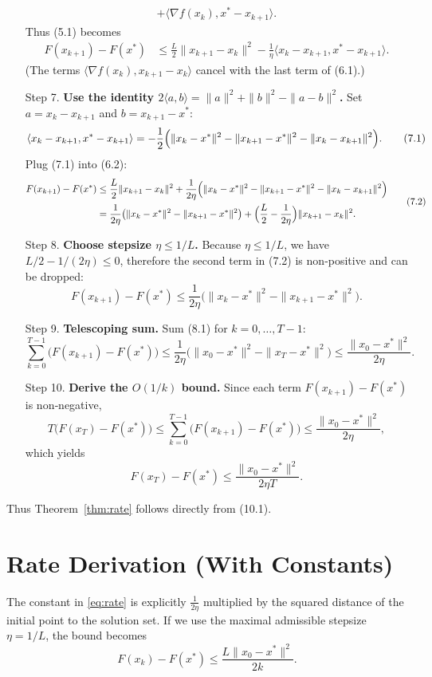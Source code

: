 \documentclass{article}
\begin{document}
\begin{enumerate}
\[\begin{aligned}
+\langle\nabla f(x_{k}),x^{*}-x_{k+1}\rangle .
\end{aligned}
\tag{6.1}
\]
Thus (5.1) becomes
\[
\begin{aligned}
F(x_{k+1})-F(x^{*})
&\le \frac{L}{2}\|x_{k+1}-x_{k}\|^{2}
   -\frac{1}{\eta}\langle x_{k}-x_{k+1},x^{*}-x_{k+1}\rangle .
\end{aligned}
\tag{6.2}
\]
(The terms $\langle\nabla f(x_{k}),x_{k+1}-x_{k}\rangle$ cancel with the last term of (6.1).)
\item[Step 7.] \textbf{Use the identity $2\langle a,b\rangle =\|a\|^{2}+\|b\|^{2}-\|a-b\|^{2}$.}  
Set $a=x_{k}-x_{k+1}$ and $b=x_{k+1}-x^{*}$:
\[
\langle x_{k}-x_{k+1},x^{*}-x_{k+1}\rangle
= -\frac12\Bigl(\|x_{k}-x^{*}\|^{2}
               -\|x_{k+1}-x^{*}\|^{2}
               -\|x_{k}-x_{k+1}\|^{2}\Bigr).
\tag{7.1}
\]
Plug (7.1) into (6.2):
\[
\begin{aligned}
F(x_{k+1})-F(x^{*})
&\le \frac{L}{2}\|x_{k+1}-x_{k}\|^{2}
   +\frac{1}{2\eta}\Bigl(\|x_{k}-x^{*}\|^{2}
               -\|x_{k+1}-x^{*}\|^{2}
               -\|x_{k}-x_{k+1}\|^{2}\Bigr)\\
&= \frac{1}{2\eta}\bigl(\|x_{k}-x^{*}\|^{2}-\|x_{k+1}-x^{*}\|^{2}\bigr)
   +\Bigl(\frac{L}{2}-\frac{1}{2\eta}\Bigr)\|x_{k+1}-x_{k}\|^{2}.
\end{aligned}
\tag{7.2}
\]
\item[Step 8.] \textbf{Choose stepsize $\eta\le 1/L$.}  
Because $\eta\le 1/L$, we have $L/2-1/(2\eta)\le0$, therefore the second term in (7.2) is non‑positive and can be dropped:
\[
F(x_{k+1})-F(x^{*})\le \frac{1}{2\eta}\bigl(\|x_{k}-x^{*}\|^{2}-\|x_{k+1}-x^{*}\|^{2}\bigr).
\tag{8.1}
\]
\item[Step 9.] \textbf{Telescoping sum.}  
Sum (8.1) for $k=0,\dots,T-1$:
\[
\sum_{k=0}^{T-1}\bigl(F(x_{k+1})-F(x^{*})\bigr)
\le \frac{1}{2\eta}\bigl(\|x_{0}-x^{*}\|^{2}-\|x_{T}-x^{*}\|^{2}\bigr)
\le \frac{\|x_{0}-x^{*}\|^{2}}{2\eta}.
\tag{9.1}
\]
\item[Step 10.] \textbf{Derive the $O(1/k)$ bound.}  
Since each term $F(x_{k+1})-F(x^{*})$ is non‑negative,
\[
T\bigl(F(x_{T})-F(x^{*})\bigr)
\le \sum_{k=0}^{T-1}\bigl(F(x_{k+1})-F(x^{*})\bigr)
\le \frac{\|x_{0}-x^{*}\|^{2}}{2\eta},
\]
which yields
\[
F(x_{T})-F(x^{*})\le \frac{\|x_{0}-x^{*}\|^{2}}{2\eta T}.
\tag{10.1}
\]
\end{enumerate}
Thus Theorem~\ref{thm:rate} follows directly from (10.1).

\section*{Rate Derivation (With Constants)}
The constant in \eqref{eq:rate} is explicitly $\frac{1}{2\eta}$ multiplied by the squared distance of the initial point to the solution set. If we use the maximal admissible stepsize $\eta=1/L$, the bound becomes
\[
F(x_{k})-F(x^{*})\le \frac{L\|x_{0}-x^{*}\|^{2}}{2k}.
\]
\end{document}
